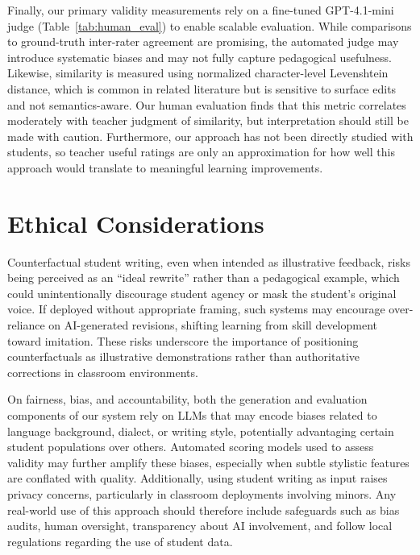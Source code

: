 \documentclass[11pt]{article}
\begin{document}
Finally, our primary validity measurements rely on a fine-tuned GPT-4.1-mini judge (Table~\ref{tab:human_eval}) to enable scalable evaluation. While comparisons to ground-truth inter-rater agreement are promising, the automated judge may introduce systematic biases and may not fully capture pedagogical usefulness. Likewise, similarity is measured using normalized character-level Levenshtein distance, which is common in related literature but is sensitive to surface edits and not semantics-aware. Our human evaluation finds that this metric correlates moderately with teacher judgment of similarity, but interpretation should still be made with caution. Furthermore, our approach has not been directly studied with students, so teacher useful ratings are only an approximation for how well this approach would translate to meaningful learning improvements.

\section*{Ethical Considerations}
Counterfactual student writing, even when intended as illustrative feedback, risks being perceived as an “ideal rewrite” rather than a pedagogical example, which could unintentionally discourage student agency or mask the student’s original voice. If deployed without appropriate framing, such systems may encourage over-reliance on AI-generated revisions, shifting learning from skill development toward imitation. These risks underscore the importance of positioning counterfactuals as illustrative demonstrations rather than authoritative corrections in classroom environments.

On fairness, bias, and accountability, both the generation and evaluation components of our system rely on LLMs that may encode biases related to language background, dialect, or writing style, potentially advantaging certain student populations over others. Automated scoring models used to assess validity may further amplify these biases, especially when subtle stylistic features are conflated with quality. Additionally, using student writing as input raises privacy concerns, particularly in classroom deployments involving minors. Any real-world use of this approach should therefore include safeguards such as bias audits, human oversight, transparency about AI involvement, and follow local regulations regarding the use of student data.

\clearpage
\end{document}
